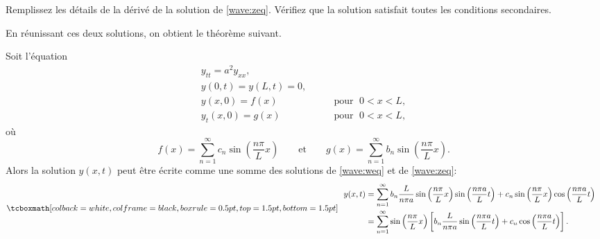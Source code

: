 \begin{exercise}
Remplissez les détails de la dérivé de la solution de \eqref{wave:zeq}.
Vérifiez que la solution satisfait toutes les conditions secondaires.
\end{exercise}

En réunissant ces deux solutions,  on obtient le théorème  suivant. 
\begin{theorem}
Soit l'équation
\begin{equation} \label{wave:tyeq}
\begin{array}{ll}
y_{tt} = a^2 y_{xx} , &  \\
y(0,t) = y(L,t) = 0 , &  \\
y(x,0) = f(x) & \qquad \text{pour } \; 0 < x < L , \\
y_t(x,0) = g(x) & \qquad \text{pour } \; 0 < x < L ,
\end{array}
\end{equation}
où
\begin{equation*}
f(x) =
\sum_{n=1}^\infty c_n \sin \left( \frac{n \pi}{L} x \right)
\qquad \text{et} \qquad
g(x) =
\sum_{n=1}^\infty b_n \sin \left( \frac{n \pi}{L} x \right) .
\end{equation*}
Alors la solution $ y (x, t) $ peut être écrite comme une somme des solutions
de \eqref{wave:weq} et de  \eqref{wave:zeq}:
\begin{equation*}
\mybxbg{~~
\begin{aligned}
y(x,t)
& =
\sum_{n=1}^\infty
b_n
\frac{L}{n \pi a}
\sin \left( \frac{n \pi}{L} x \right)
\sin \left( \frac{n \pi a}{L} t \right) 
+
c_n
\sin \left( \frac{n \pi}{L} x \right)
\cos \left( \frac{n \pi a}{L} t \right) 
\\
& =
\sum_{n=1}^\infty
\sin \left( \frac{n \pi}{L} x \right)
\left[
b_n
\frac{L}{n \pi a}
\sin \left( \frac{n \pi a}{L} t \right) 
+
c_n
\cos \left( \frac{n \pi a}{L} t \right) 
\right] .
\end{aligned}
~~}
\end{equation*}
\end{theorem}


